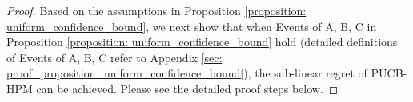 \begin{proof}

Based on the assumptions in Proposition \ref{proposition: uniform_confidence_bound}, we next show that when Events of A, B, C in Proposition \ref{proposition: uniform_confidence_bound} hold (detailed definitions of Events of A, B, C refer to Appendix \ref{sec: proof_proposition_uniform_confidence_bound}), the sub-linear regret of PUCB-HPM can be achieved. Please see the detailed proof steps below.











\end{proof}
